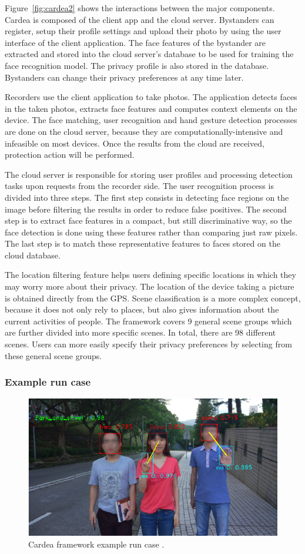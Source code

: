 \documentclass[conference]{IEEEtran}
\begin{document}
Figure~\ref{fig:cardea2} shows the interactions between the major components. Cardea is composed of the client app and the cloud server. Bystanders can register, setup their profile settings and upload their photo by using the user interface of the client application. The face features of the bystander are extracted and stored into the cloud server's database to be used for training the face recognition model. The privacy profile is also stored in the database. Bystanders can change their privacy preferences at any time later. 

Recorders use the client application to take photos. The application detects faces in the taken photos, extracts face features and computes context elements on the device. The face matching, user recognition and hand gesture detection processes are done on the cloud server, because they are computationally-intensive and infeasible on most devices. Once the results from the cloud are received, protection action will be performed. 

The cloud server is responsible for storing user profiles and processing detection tasks upon requests from the recorder side. The user recognition process is divided into three steps. The first step consists in detecting face regions on the image before filtering the results in order to reduce false positives. The second step is to extract face features in a compact, but still discriminative way, so the face detection is done using these features rather than comparing just raw pixels. The last step is to match these representative features to faces stored on the cloud database. 

The location filtering feature helps users defining specific locations in which they may worry more about their privacy. The location of the device taking a picture is obtained directly from the \ac{GPS}. Scene classification is a more complex concept, because it does not only rely to places, but also gives information about the current activities of people. The framework covers 9 general scene groups which are further divided into more specific scenes. In total, there are 98 different scenes. Users can more easily specify their privacy preferences by selecting from these general scene groups. 


\subsubsection{Example run case}
\begin{figure}[t]
\centerline{\includegraphics[width=.5\textwidth]{img/cardea_example.png}}
\caption{Cardea framework example run case \cite{shu2016cardea}.}
\label{fig:cardea3}
\end{figure}
\end{document}
